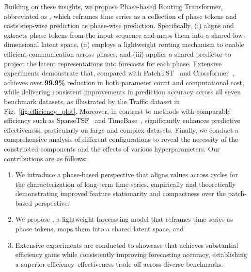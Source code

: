 Building on these insights, we propose Phase-based Routing Transformer, abbreviated as \textbf{\sysname}, which reframes time series as a collection of phase tokens and casts step-wise prediction as phase-wise prediction. Specifically, \sysname (i) aligns and extracts phase tokens from the input sequence and maps them into a shared low-dimensional latent space, (ii) employs a lightweight routing mechanism to enable efficient communication across phases, and (iii) applies a shared predictor to project the latent representations into forecasts for each phase. Extensive experiments demonstrate that, compared with PatchTST~\citep{nie2023patchtst} and Crossformer~\citep{zhang2023crossformer}, \sysname achieves over \textbf{99.9\%} reduction in both parameter count and computational cost, while delivering consistent improvements in prediction accuracy across all seven benchmark datasets, as illustrated by the Traffic dataset in Fig.~\ref{fig:efficiency_plot}. 
Moreover, in contrast to methods with comparable efficiency  such as SparseTSF~\citep{lin2024sparsetsf} and TimeBase~\citep{huang2025timebase}, \sysname significantly enhances predictive effectiveness, particularly on large and complex datasets. 
Finally, we conduct a comprehensive analysis of different configurations to reveal the necessity of the constructed components and the effects of various hyperparameters. Our contributions are as follows:


\begin{enumerate}[leftmargin=2em]
\item We introduce a phase-based perspective that aligns values across cycles for the characterization of long-term time series, empirically and theoretically demonstrating improved feature stationarity and compactness over the patch-based perspective.

\item We propose \sysname, a lightweight forecasting model that reframes time series as phase tokens, maps them into a shared latent space, and 

\item Extensive experiments are conducted to showcase that \sysname achieves substantial efficiency gains while consistently improving forecasting accuracy, establishing a superior efficiency–effectiveness trade-off across diverse benchmarks.
\end{enumerate}

